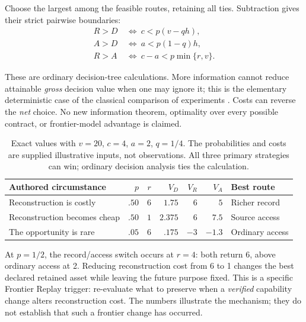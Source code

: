 Choose the largest among the feasible routes, retaining all ties. Subtraction gives their strict pairwise boundaries:
\begin{align}
R>D&\ \Longleftrightarrow\ c<p(v-qh),\nonumber\\
A>D&\ \Longleftrightarrow\ a<p(1-q)h,\label{eq:preservation-boundaries}\\
R>A&\ \Longleftrightarrow\ c-a<p\min\{r,v\}.\nonumber
\end{align}

These are ordinary decision-tree calculations. More information cannot reduce attainable \emph{gross} decision value when one may ignore it; this is the elementary deterministic case of the classical comparison of experiments \citep{blackwell}. Costs can reverse the \emph{net} choice. No new information theorem, optimality over every possible contract, or frontier-model advantage is claimed.

\begin{table}[htbp]
\centering\small
\begin{tabularx}{\textwidth}{YrrrrrP{1.23in}}
\toprule
\textbf{Authored circumstance} & $p$ & $r$ & $V_D$ & $V_R$ & $V_A$ & \textbf{Best route}\\
\midrule
Reconstruction is costly & $.50$ & $6$ & $1.75$ & $6$ & $5$ & Richer record\\
Reconstruction becomes cheap & $.50$ & $1$ & $2.375$ & $6$ & $7.5$ & Source access\\
The opportunity is rare & $.05$ & $6$ & $.175$ & $-3$ & $-1.3$ & Ordinary access\\
\bottomrule
\end{tabularx}
\caption{Exact values with $v=20$, $c=4$, $a=2$, $q=1/4$. The probabilities and costs are supplied illustrative inputs, not observations. All three primary strategies can win; ordinary decision analysis ties the calculation.}
\label{tab:preservation}
\end{table}

At $p=1/2$, the record/access switch occurs at $r=4$: both return 6, above ordinary access at 2. Reducing reconstruction cost from 6 to 1 changes the best declared retained asset while leaving the future purpose fixed. This is a specific Frontier Replay trigger: re-evaluate what to preserve when a \emph{verified} capability change alters reconstruction cost. The numbers illustrate the mechanism; they do not establish that such a frontier change has occurred.

